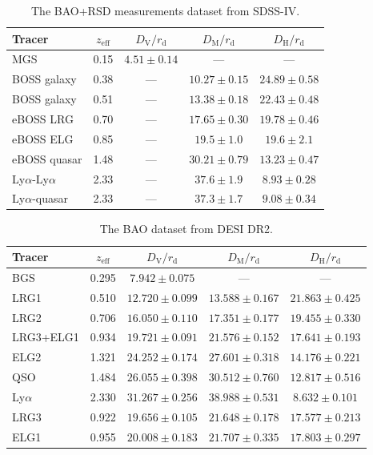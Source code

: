 \documentclass[twocolumn]{aastex631}
\begin{document}
   \begin{table}
      \centering
      \begin{tabular}{lcccc}
         \hline\hline
         Tracer & $z_{\text{eff}}$ & $D_{\text{V}}/r_{\text{d}}$ & 
         $D_{\text{M}}/r_{\text{d}}$ & $D_{\text{H}}/r_{\text{d}}$ \\
         \hline
         MGS & 0.15 & $4.51 \pm 0.14$ & --- & --- \\
         BOSS galaxy & 0.38 & --- & $10.27 \pm 0.15$ & $24.89 \pm 0.58$ \\
         BOSS galaxy & 0.51 & --- & $13.38 \pm 0.18$ & $22.43 \pm 0.48$ \\
         eBOSS LRG & 0.70 & --- & $17.65 \pm 0.30$ & $19.78 \pm 0.46$ \\
         eBOSS ELG & 0.85 & --- & $19.5 \pm 1.0$ & $19.6 \pm 2.1$ \\
         eBOSS quasar& 1.48 & --- & $30.21 \pm 0.79$ & $13.23 \pm 0.47$ \\
         Ly$\alpha$-Ly$\alpha$ & 2.33 & --- & $37.6 \pm 1.9$ & $8.93 \pm 0.28$ \\
         Ly$\alpha$-quasar & 2.33 & --- & $37.3 \pm 1.7$ & $9.08 \pm 0.34$ \\
         \hline
      \end{tabular}
      \caption{The BAO+RSD measurements dataset from SDSS-IV.}
      \label{tab:2}
   \end{table}

   \begin{table}
      \centering
      \begin{tabular}{lcccc}
         \hline\hline
         Tracer & $z_{\text{eff}}$ & $D_{\text{V}}/r_{\text{d}}$ & 
         $D_{\text{M}}/r_{\text{d}}$ & $D_{\text{H}}/r_{\text{d}}$ \\
         \hline
         BGS & 0.295 & $7.942 \pm 0.075$  & --- & --- \\
         LRG1 & 0.510 & $12.720 \pm 0.099$ & $13.588 \pm 0.167$ & $21.863 \pm 0.425$ \\
         LRG2 & 0.706 & $16.050 \pm 0.110$ & $17.351 \pm 0.177$ & $19.455 \pm 0.330$ \\
         LRG3+ELG1 & 0.934 & $19.721 \pm 0.091$ & $21.576 \pm 0.152$ & $17.641 \pm 0.193$ \\
         ELG2 & 1.321 & $24.252 \pm 0.174$ & $27.601 \pm 0.318$ & $14.176 \pm 0.221$ \\
         QSO & 1.484 & $26.055 \pm 0.398$ & $30.512 \pm 0.760$ & $12.817 \pm 0.516$ \\
         Ly$\alpha$ & 2.330 & $31.267 \pm 0.256$ & $38.988 \pm 0.531$ & $8.632 \pm 0.101$ \\
         \hline
         LRG3 & 0.922 & $19.656 \pm 0.105$ & $21.648 \pm 0.178$ & $17.577 \pm 0.213$ \\
         ELG1 & 0.955 & $20.008 \pm 0.183$ & $21.707 \pm 0.335$ & $17.803 \pm 0.297$ \\    
         \hline
      \end{tabular}
      \caption{The BAO dataset from DESI DR2.}
      \label{tab:3}
   \end{table}
\end{document}
